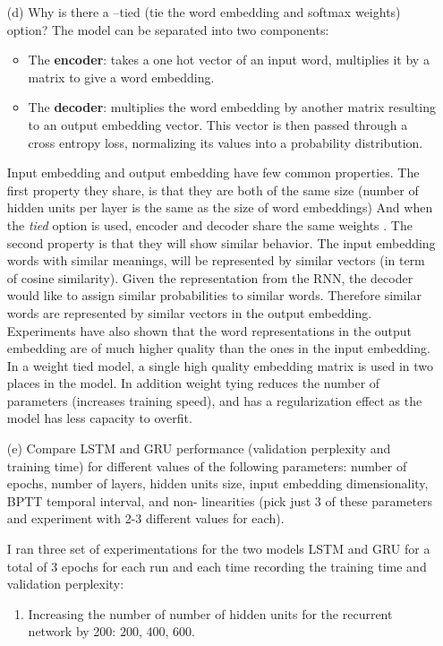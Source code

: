 \documentclass[11pt]{article}
\newcommand{\0}{\mat{0}}
\begin{document}
\begin{itemize}
     \item[(d)] 
    Why is there a --tied (tie the word embedding and softmax weights) option?
    The model can be separated into two components:
    \begin{itemize}
     \item The \textbf{encoder}: takes a one hot vector of an input word, multiplies it by a matrix to give a word embedding. 
     \item The \textbf{decoder}: multiplies the word embedding by another matrix resulting to an output embedding vector. This vector is then passed through a cross entropy loss, normalizing its values into a probability distribution.
    \end{itemize}
    Input embedding and output embedding have few common properties. The first property they share, is that they are both of the same size (number of hidden units per layer is the same as the size of word embeddings) And when the \textit{tied} option is used, encoder and decoder share the same weights . The second property is that they will show similar behavior.
    The input embedding words with similar meanings, will be represented by similar vectors (in term of cosine similarity). Given the representation from the RNN, the decoder would like to assign similar probabilities to similar words.
    Therefore similar words are represented by similar vectors in the output embedding. Experiments have also shown that the word representations in the output embedding are of much higher quality than the ones in the input
    embedding. In a weight tied model, a single high quality embedding matrix is used in two places in the model. In addition weight tying reduces the number of parameters (increases training speed), and has a regularization effect
    as the model has less capacity to overfit.       
    
     \item[(e)] 
     Compare LSTM and GRU performance (validation perplexity and training time) for different values of the following parameters: number of epochs, number of layers, hidden units size, input embedding dimensionality, BPTT temporal interval, and non- linearities (pick just 3 of these parameters and experiment with 2-3 different values for each).
     
     I ran three set of experimentations for the two models LSTM and GRU for a total of 3 epochs for each run and each time recording the training time and validation perplexity:
     \begin{enumerate}
     	\item Increasing the number of number of hidden units for the recurrent network by 200: 200, 400, 600.

\end{enumerate}
\end{itemize}
\end{document}
